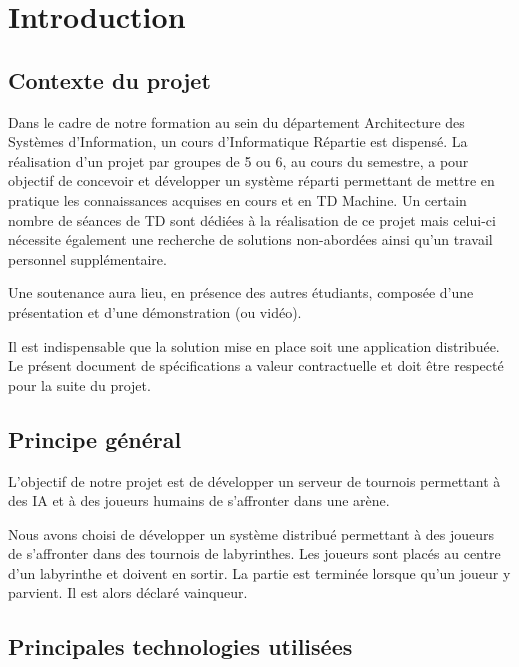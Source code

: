 \chapter{Introduction}

\section{Contexte du projet}
    Dans le cadre de notre formation au sein du département Architecture des Systèmes d'Information, un cours d'Informatique Répartie est dispensé. La réalisation d'un projet par groupes de 5 ou 6, au cours du semestre, a pour objectif de concevoir et développer un système réparti permettant de mettre en pratique les connaissances acquises en cours et en TD Machine. Un certain nombre de séances de TD sont dédiées à la réalisation de ce projet mais celui-ci nécessite également une recherche de solutions non-abordées ainsi qu'un travail personnel supplémentaire.

    Une soutenance aura lieu, en présence des autres étudiants, composée d'une présentation et d'une démonstration (ou vidéo).

    Il est indispensable que la solution mise en place soit une application distribuée. Le présent document de spécifications a valeur contractuelle et doit être respecté pour la suite du projet.

\section{Principe général}
    L'objectif de notre projet est de développer un serveur de tournois permettant à des IA et à des joueurs humains de s'affronter dans une arène.

    Nous avons choisi de développer un système distribué permettant à des joueurs de s'affronter dans des tournois de labyrinthes. Les joueurs sont placés au centre d'un labyrinthe et doivent en sortir. La partie est terminée lorsque qu'un joueur y parvient. Il est alors déclaré vainqueur.

\section{Principales technologies utilisées}
\label{sec:principales_technologies}

